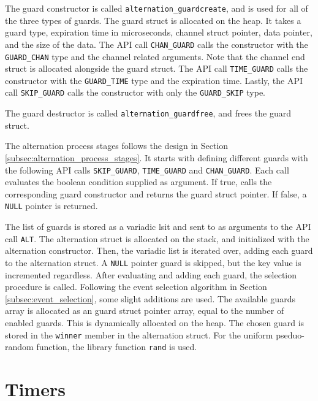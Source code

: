 The guard constructor is called \texttt{alternation\_guardcreate}, and is used for all of the three types of guards. The guard struct is allocated on the heap. It takes a guard type, expiration time in microseconds, channel struct pointer, data pointer, and the size of the data. The API call \texttt{CHAN\_GUARD} calls the constructor with the \texttt{GUARD\_CHAN} type and the channel related arguments. Note that the channel end struct is allocated alongside the guard struct. The API call \texttt{TIME\_GUARD} calls the constructor with the \texttt{GUARD\_TIME} type and the expiration time. Lastly, the API call \texttt{SKIP\_GUARD} calls the constructor with only the \texttt{GUARD\_SKIP} type. 

The guard destructor is called \texttt{alternation\_guardfree}, and frees the guard struct.

The alternation process stages follows the design in Section \ref{subsec:alternation_process_stages}. It starts with defining different guards with the following API calls \texttt{SKIP\_GUARD}, \texttt{TIME\_GUARD} and \texttt{CHAN\_GUARD}. Each call evaluates the boolean condition supplied as argument. If true, calls the corresponding guard constructor and returns the guard struct pointer. If false, a \texttt{NULL} pointer is returned. 

The list of guards is stored as a variadic lsit and sent to as arguments to the API call \texttt{ALT}. The alternation struct is allocated on the stack, and initialized with the alternation constructor. Then, the variadic list is iterated over, adding each guard to the alternation struct. A \texttt{NULL} pointer guard is skipped, but the key value is incremented regardless. After evaluating and adding each guard, the selection procedure is called. Following the event selection algorithm in Section \ref{subsec:event_selection}, some slight additions are used. The available guards array is allocated as an guard struct pointer array, equal to the number of enabled guards. This is dynamically allocated on the heap. The chosen guard is stored in the \texttt{winner} member in the alternation struct. For the uniform pseduo\hyp{}random function, the library function \texttt{rand} is used.

\section{Timers}



